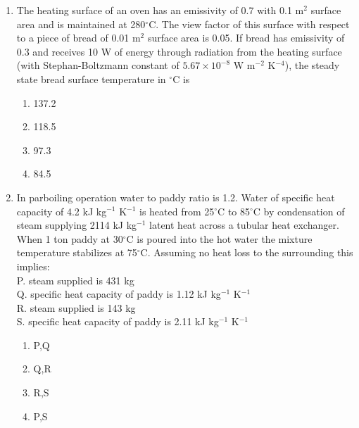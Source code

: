 \documentclass[journal]{IEEEtran}
\numberwithin{equation}{enumi}
\numberwithin{figure}{enumi}
\begin{document}
\begin{enumerate}
    
\item
The heating surface of an oven has an emissivity of 0.7 with 0.1 m$^2$ surface area and is maintained at 280$^\circ$C. The view factor of this surface with respect to a piece of bread of 0.01 m$^2$ surface area is 0.05. If bread has emissivity of 0.3 and receives 10 W of energy through radiation from the heating surface (with Stephan-Boltzmann constant of $5.67 \times 10^{-8}$ W m$^{-2}$ K$^{-4}$), the steady state bread surface temperature in $^\circ$C is
\hfill{}
\begin{multicols}{4}
    \begin{enumerate}
    \item 137.2
    \item 118.5
    \item 97.3
    \item 84.5
    \end{enumerate}
    \end{multicols}  


    
\item
In parboiling operation water to paddy ratio is 1.2. Water of specific heat capacity of 4.2 kJ kg$^{-1}$ K$^{-1}$ is heated from 25$^\circ$C to 85$^\circ$C by condensation of steam supplying 2114 kJ kg$^{-1}$ latent heat across a tubular heat exchanger. When 1 ton paddy at 30$^\circ$C is poured into the hot water the mixture temperature stabilizes at 75$^\circ$C. Assuming no heat loss to the surrounding this implies:
\\
P. steam supplied is 431 kg \\
Q. specific heat capacity of paddy is 1.12 kJ kg$^{-1}$ K$^{-1}$ \\
R. steam supplied is 143 kg \\
S. specific heat capacity of paddy is 2.11 kJ kg$^{-1}$ K$^{-1}$
\hfill{}
\begin{multicols}{4}
    \begin{enumerate}
    \item P,Q
    \item Q,R
    \item R,S
    \item  P,S
    \end{enumerate}
    \end{multicols}  




\end{enumerate}
\end{document}
